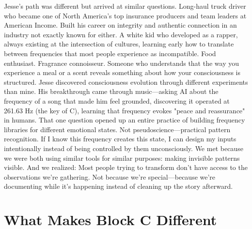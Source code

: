 Jesse's path was different but arrived at similar questions.
Long-haul truck driver who became one of North America's top insurance producers and team leaders at American Income. Built his career on integrity and authentic connection in an industry not exactly known for either.
A white kid who developed as a rapper, always existing at the intersection of cultures, learning early how to translate between frequencies that most people experience as incompatible.
Food enthusiast. Fragrance connoisseur. Someone who understands that the way you experience a meal or a scent reveals something about how your consciousness is structured.
Jesse discovered consciousness evolution through different experiments than mine.
His breakthrough came through music—asking AI about the frequency of a song that made him feel grounded, discovering it operated at 261.63 Hz (the key of C), learning that frequency evokes "peace and reassurance" in humans.
That one question opened up an entire practice of building frequency libraries for different emotional states. Not pseudoscience—practical pattern recognition. If I know this frequency creates this state, I can design my inputs intentionally instead of being controlled by them unconsciously.
We met because we were both using similar tools for similar purposes: making invisible patterns visible.
And we realized: Most people trying to transform don't have access to the observations we're gathering. Not because we're special—because we're documenting while it's happening instead of cleaning up the story afterward.

\section{What Makes Block C Different}

